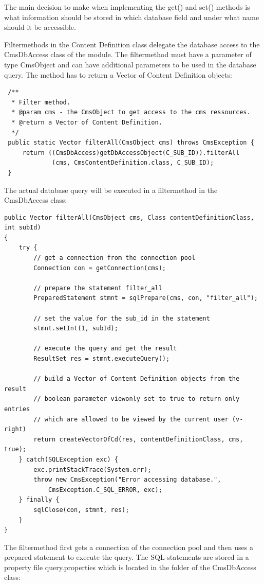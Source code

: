 The main decision to make when implementing the {\meth get()} and {\meth set()}
methods is what information should be stored in which database field 
and under what name should it be accessible. 

Filtermethods in the Content Definition class delegate the database access
to the {\class CmsDbAccess} class of the module. The filtermethod must have a parameter
of type {\class CmsObject} and can have additional parameters to be used in the database query.
The method has to return a Vector of Content Definition objects:

\begin{verbatim}
 /**
  * Filter method.
  * @param cms - the CmsObject to get access to the cms ressources.
  * @return a Vector of Content Definition.
  */
 public static Vector filterAll(CmsObject cms) throws CmsException {
     return ((CmsDbAccess)getDbAccessObject(C_SUB_ID)).filterAll
             (cms, CmsContentDefinition.class, C_SUB_ID);
 }
\end{verbatim}


The actual database query will be executed in a filtermethod in the {\class CmsDbAccess} class:

\begin{verbatim}
public Vector filterAll(CmsObject cms, Class contentDefinitionClass, int subId)
{
	try {
		// get a connection from the connection pool
		Connection con = getConnection(cms);
   
		// prepare the statement filter_all
		PreparedStatement stmnt = sqlPrepare(cms, con, "filter_all");
   
		// set the value for the sub_id in the statement
		stmnt.setInt(1, subId);
   
		// execute the query and get the result
		ResultSet res = stmnt.executeQuery();
   
		// build a Vector of Content Definition objects from the result
		// boolean parameter viewonly set to true to return only entries 
		// which are allowed to be viewed by the current user (v-right)
		return createVectorOfCd(res, contentDefinitionClass, cms, true);
	} catch(SQLException exc) {
		exc.printStackTrace(System.err);
		throw new CmsException("Error accessing database.",
			CmsException.C_SQL_ERROR, exc);
	} finally {
		sqlClose(con, stmnt, res);
	}   
}
\end{verbatim}

The filtermethod first gets a connection of the connection pool and then uses a prepared
statement to execute the query.
The SQL-statements are stored in a property file query.properties which is located in the folder of
the {\class CmsDbAccess} class:

